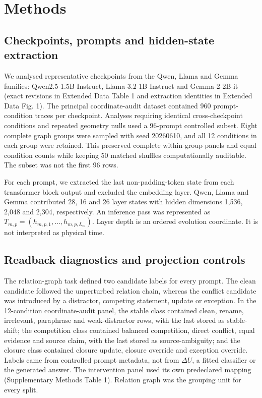 \documentclass[12pt]{article}
\begin{document}
\section*{Methods}

\subsection*{Checkpoints, prompts and hidden-state extraction}

We analysed representative checkpoints from the Qwen, Llama and Gemma families: Qwen2.5-1.5B-Instruct, Llama-3.2-1B-Instruct and Gemma-2-2B-it (exact revisions in Extended Data Table 1 and extraction identities in Extended Data Fig. 1). The principal coordinate-audit dataset contained 960 prompt-condition traces per checkpoint. Analyses requiring identical cross-checkpoint conditions and repeated geometry nulls used a 96-prompt controlled subset. Eight complete graph groups were sampled with seed 20260610, and all 12 conditions in each group were retained. This preserved complete within-group panels and equal condition counts while keeping 50 matched shuffles computationally auditable. The subset was not the first 96 rows.

For each prompt, we extracted the last non-padding-token state from each transformer block output and excluded the embedding layer. Qwen, Llama and Gemma contributed 28, 16 and 26 layer states with hidden dimensions 1,536, 2,048 and 2,304, respectively. An inference pass was represented as \(T_{m,p}=(h_{m,p,1},\ldots,h_{m,p,L_m})\). Layer depth is an ordered evolution coordinate. It is not interpreted as physical time.

\subsection*{Readback diagnostics and projection controls}

The relation-graph task defined two candidate labels for every prompt. The clean candidate followed the unperturbed relation chain, whereas the conflict candidate was introduced by a distractor, competing statement, update or exception. In the 12-condition coordinate-audit panel, the stable class contained clean, rename, irrelevant, paraphrase and weak-distractor rows, with the last stored as stable-shift; the competition class contained balanced competition, direct conflict, equal evidence and source claim, with the last stored as source-ambiguity; and the closure class contained closure update, closure override and exception override. Labels came from controlled prompt metadata, not from \(\Delta U\), a fitted classifier or the generated answer. The intervention panel used its own predeclared mapping (Supplementary Methods Table 1). Relation graph was the grouping unit for every split.
\end{document}
